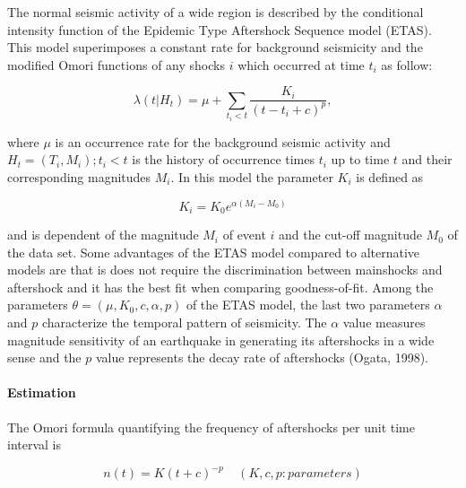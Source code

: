 \documentclass[12pt]{article} %
\theoremstyle{plain}
\begin{document}
	The normal seismic activity of a wide region is described by the conditional intensity function of the Epidemic Type Aftershock Sequence model (ETAS). This model superimposes a constant rate for background seismicity and the modified Omori functions of any shocks $i$ which occurred at time $t_i$ as follow:
	
	\begin{equation} \label{eq:ETAS}
		\lambda(t|H_t)=\mu + \sum_{t_i<t} \frac{K_i}{(t-t_i+c)^{p}},
	\end{equation}
	
	\noindent where $\mu$ is an occurrence rate for the background seismic activity and $H_t={(T_i,M_i);t_i<t}$ is the history of occurrence times ${t_i}$ up to time $t$ and their corresponding magnitudes ${M_i}$. In this model the parameter $K_i$ is defined as 
	
	\begin{equation} \label{eq:K}
		K_i=K_0e^{\alpha(M_i-M_0)}
	\end{equation}
	
	\noindent and is dependent of the magnitude $M_i$ of event $i$ and the cut-off magnitude $M_0$ of the data set. Some advantages of the ETAS model compared to alternative models are that is does not require the discrimination between mainshocks and aftershock and it has the best fit when comparing goodness-of-fit. Among the parameters $\theta=(\mu,K_0,c,\alpha,p)$ of the ETAS model, the last two parameters $\alpha$ and $p$ characterize the temporal pattern of seismicity. The $\alpha$ value measures magnitude sensitivity of an earthquake in generating its aftershocks in a wide sense and the $p$ value represents the decay rate of aftershocks (Ogata, 1998).
	
	
	\paragraph{Estimation}
	
	The Omori formula quantifying the frequency of aftershocks per unit time interval is 
	
	\begin{equation} \label{eq:ppintensity}
		n(t)=K(t+c)^{-p} \ \ \ \ \  (K,c,p:parameters)
	\end{equation}
	
\end{document}
